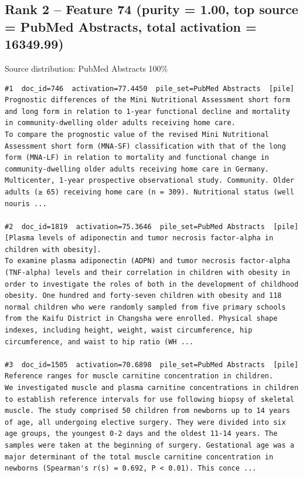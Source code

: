 \subsection*{Rank 2 -- Feature 74 (purity = 1.00, top source = PubMed Abstracts, total activation = 16349.99)}

Source distribution: PubMed Abstracts 100\%

\begin{verbatim}
#1  doc_id=746  activation=77.4450  pile_set=PubMed Abstracts  [pile]
Prognostic differences of the Mini Nutritional Assessment short form and long form in relation to 1-year functional decline and mortality in community-dwelling older adults receiving home care.
To compare the prognostic value of the revised Mini Nutritional Assessment short form (MNA-SF) classification with that of the long form (MNA-LF) in relation to mortality and functional change in community-dwelling older adults receiving home care in Germany. Multicenter, 1-year prospective observational study. Community. Older adults (≥ 65) receiving home care (n = 309). Nutritional status (well nouris ...

#2  doc_id=1819  activation=75.3646  pile_set=PubMed Abstracts  [pile]
[Plasma levels of adiponectin and tumor necrosis factor-alpha in children with obesity].
To examine plasma adiponectin (ADPN) and tumor necrosis factor-alpha (TNF-alpha) levels and their correlation in children with obesity in order to investigate the roles of both in the development of childhood obesity. One hundred and forty-seven children with obesity and 118 normal children who were randomly sampled from five primary schools from the Kaifu District in Changsha were enrolled. Physical shape indexes, including height, weight, waist circumference, hip circumference, and waist to hip ratio (WH ...

#3  doc_id=1505  activation=70.6898  pile_set=PubMed Abstracts  [pile]
Reference ranges for muscle carnitine concentration in children.
We investigated muscle and plasma carnitine concentrations in children to establish reference intervals for use following biopsy of skeletal muscle. The study comprised 50 children from newborns up to 14 years of age, all undergoing elective surgery. They were divided into six age groups, the youngest 0-2 days and the oldest 11-14 years. The samples were taken at the beginning of surgery. Gestational age was a major determinant of the total muscle carnitine concentration in newborns (Spearman's r(s) = 0.692, P < 0.01). This conce ...


\end{verbatim}
